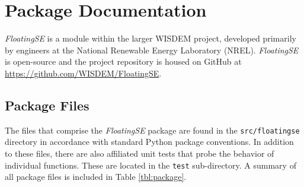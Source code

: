 \chapter{Package Documentation}
\label{sec:package}
\textit{FloatingSE} is a module within the larger WISDEM project,
developed primarily by engineers at the National Renewable Energy
Laboratory (NREL).  \textit{FloatingSE} is open-source and the project
repository is housed on GitHub at
\url{https://github.com/WISDEM/FloatingSE}.

\section{Package Files}
The files that comprise the \textit{FloatingSE} package are found in the
\texttt{src/floatingse} directory in accordance with standard Python
package conventions.  In addition to these files, there are also
affiliated unit tests that probe the behavior of individual functions.
These are located in the \texttt{test} sub-directory.  A summary of all
package files is included in Table \ref{tbl:package}.

